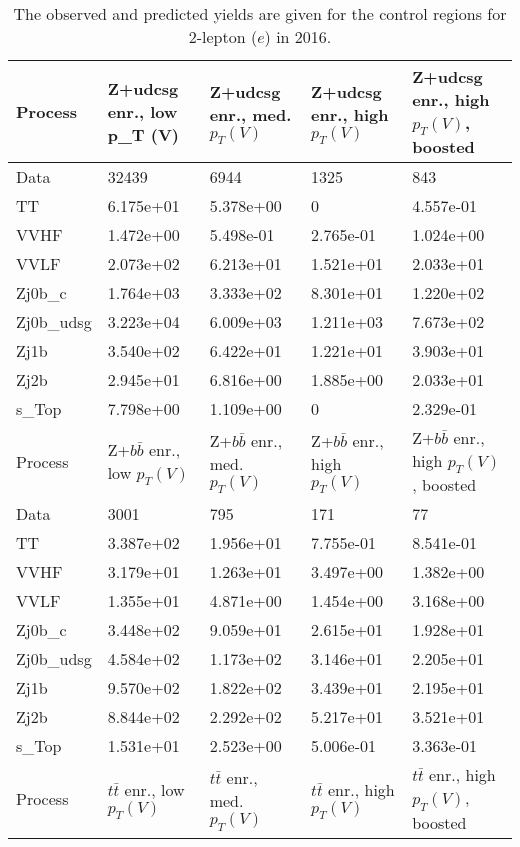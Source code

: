 \begin{table}
\centering
\caption[2016 2-lepton ($e$) control region yields]{
                  The observed and predicted yields are given for the
                  control regions for 2-lepton ($e$) in 2016.
                  }
{\footnotesize
\begin{tabularx}{\textwidth}{|X|X|X|X|X|}
\hline
Process & Z+udcsg enr., low p_{T} (V) & Z+udcsg enr., med. $p_{T}(V)$ & Z+udcsg enr., high $p_{T}(V)$ & Z+udcsg enr., high $p_{T}(V)$, boosted \\
\hline
Data & 32439 & 6944 & 1325 & 843 \\
\hline
TT & 6.175e+01 & 5.378e+00 & 0 & 4.557e-01 \\
VVHF & 1.472e+00 & 5.498e-01 & 2.765e-01 & 1.024e+00 \\
VVLF & 2.073e+02 & 6.213e+01 & 1.521e+01 & 2.033e+01 \\
Zj0b\_c & 1.764e+03 & 3.333e+02 & 8.301e+01 & 1.220e+02 \\
Zj0b\_udsg & 3.223e+04 & 6.009e+03 & 1.211e+03 & 7.673e+02 \\
Zj1b & 3.540e+02 & 6.422e+01 & 1.221e+01 & 3.903e+01 \\
Zj2b & 2.945e+01 & 6.816e+00 & 1.885e+00 & 2.033e+01 \\
s\_Top & 7.798e+00 & 1.109e+00 & 0 & 2.329e-01 \\
\hline
\hline
Process & Z+$b\bar{b}$ enr., low $p_{T}(V)$ & Z+$b\bar{b}$ enr., med. $p_{T}(V)$ & Z+$b\bar{b}$ enr., high $p_{T}(V)$ & Z+$b\bar{b}$ enr., high $p_{T}(V)$, boosted \\
\hline
Data & 3001 & 795 & 171 & 77 \\
\hline
TT & 3.387e+02 & 1.956e+01 & 7.755e-01 & 8.541e-01 \\
VVHF & 3.179e+01 & 1.263e+01 & 3.497e+00 & 1.382e+00 \\
VVLF & 1.355e+01 & 4.871e+00 & 1.454e+00 & 3.168e+00 \\
Zj0b\_c & 3.448e+02 & 9.059e+01 & 2.615e+01 & 1.928e+01 \\
Zj0b\_udsg & 4.584e+02 & 1.173e+02 & 3.146e+01 & 2.205e+01 \\
Zj1b & 9.570e+02 & 1.822e+02 & 3.439e+01 & 2.195e+01 \\
Zj2b & 8.844e+02 & 2.292e+02 & 5.217e+01 & 3.521e+01 \\
s\_Top & 1.531e+01 & 2.523e+00 & 5.006e-01 & 3.363e-01 \\
\hline
\hline
Process & $t\bar{t}$ enr., low $p_{T}(V)$ & $t\bar{t}$ enr., med. $p_{T}(V)$ & $t\bar{t}$ enr., high $p_{T}(V)$ & $t\bar{t}$ enr., high $p_{T}(V)$, boosted \\

\end{tabularx}}
\end{table}
